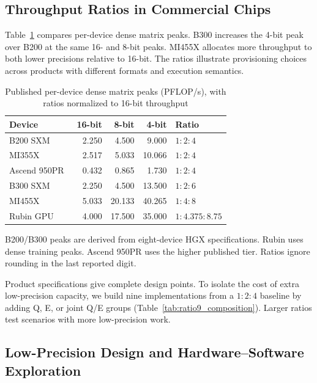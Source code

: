 \documentclass[conference,9pt,letterpaper]{IEEEtran}
\begin{document}
\subsection{Throughput Ratios in Commercial Chips}
\label{sec:commercial_ratios}
\label{sec:ratio_motivation}

Table~\ref{tab:vendor_ratios} compares per-device dense matrix peaks. B300 increases the 4-bit peak over B200 at the same 16- and 8-bit peaks. MI455X allocates more throughput to both lower precisions relative to 16-bit. The ratios illustrate provisioning choices across products with different formats and execution semantics.

\begin{table}[t]
\centering
\caption{Published per-device dense matrix peaks (PFLOP/s), with ratios normalized to 16-bit throughput}
\label{tab:vendor_ratios}
\begingroup\footnotesize\setlength{\tabcolsep}{2pt}
\begin{tabular*}{\columnwidth}{@{\extracolsep{\fill}}lrrrl@{}}\toprule
Device & 16-bit & 8-bit & 4-bit & Ratio \\\midrule
B200 SXM~\cite{nvidiahgx} & 2.250 & 4.500 & 9.000 & $1:2:4$ \\
MI355X~\cite{amdmi355x} & 2.517 & 5.033 & 10.066 & $1:2:4$ \\
Ascend 950PR~\cite{huawei950} & 0.432 & 0.865 & 1.730 & $1:2:4$ \\
B300 SXM~\cite{nvidiahgx} & 2.250 & 4.500 & 13.500 & $1:2:6$ \\
MI455X~\cite{amdmi455x} & 5.033 & 20.133 & 40.265 & $1:4:8$ \\
Rubin GPU~\cite{nvidiaverarubin} & 4.000 & 17.500 & 35.000 & $1:4.375:8.75$ \\
\bottomrule
\end{tabular*}
\par\smallskip
\parbox{\columnwidth}{\raggedright B200/B300 peaks are derived from eight-device HGX specifications. Rubin uses dense training peaks. Ascend 950PR uses the higher published tier. Ratios ignore rounding in the last reported digit.}
\endgroup
\end{table}

Product specifications give complete design points. To isolate the cost of extra low-precision capacity, we build nine implementations from a $1:2:4$ baseline by adding Q, E, or joint Q/E groups (Table~\ref{tab:ratio9_composition}). Larger ratios test scenarios with more low-precision work.

\subsection{Low-Precision Design and Hardware--Software Exploration}
\label{sec:datapath_sharing}
\end{document}
